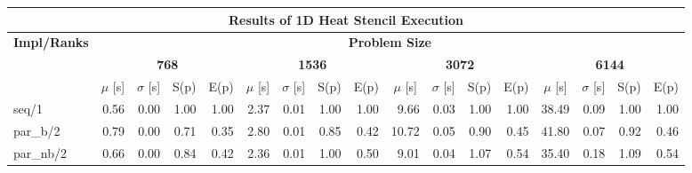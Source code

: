 \begin{tabular}{|lllllllllllllllll|}
\hline
\multicolumn{17}{|c|}{\textbf{Results of 1D Heat Stencil Execution}} \\ \hline
\multicolumn{1}{|c|}{\textbf{Impl/Ranks}} & \multicolumn{16}{c|}{\textbf{Problem Size}} \\ \hline
\multicolumn{1}{|c|}{\textbf{}} & \multicolumn{4}{c|}{\textbf{768}} & \multicolumn{4}{c|}{\textbf{1536}} & \multicolumn{4}{c|}{\textbf{3072}} & \multicolumn{4}{c|}{\textbf{6144}} \\ \hline
\multicolumn{1}{|l|}{} & \multicolumn{1}{c|}{$\mu$ [s]} & \multicolumn{1}{c|}{$\sigma$ [s]} & \multicolumn{1}{c|}{S(p)} & \multicolumn{1}{c|}{E(p)} & \multicolumn{1}{c|}{$\mu$ [s]} & \multicolumn{1}{c|}{$\sigma$ [s]} & \multicolumn{1}{c|}{S(p)} & \multicolumn{1}{c|}{E(p)} & \multicolumn{1}{c|}{$\mu$ [s]} & \multicolumn{1}{c|}{$\sigma$ [s]} & \multicolumn{1}{c|}{S(p)} & \multicolumn{1}{c|}{E(p)} & \multicolumn{1}{c|}{$\mu$ [s]} & \multicolumn{1}{c|}{$\sigma$ [s]} & \multicolumn{1}{c|}{S(p)} & \multicolumn{1}{c|}{E(p)} \\ \hline
\multicolumn{1}{|l|}{seq/1}  & \multicolumn{1}{r|}{0.56} & \multicolumn{1}{r|}{0.00} & \multicolumn{1}{r|}{1.00} & \multicolumn{1}{r|}{1.00}  & \multicolumn{1}{r|}{2.37} & \multicolumn{1}{r|}{0.01} & \multicolumn{1}{r|}{1.00} & \multicolumn{1}{r|}{1.00}  & \multicolumn{1}{r|}{9.66} & \multicolumn{1}{r|}{0.03} & \multicolumn{1}{r|}{1.00} & \multicolumn{1}{r|}{1.00}  & \multicolumn{1}{r|}{38.49} & \multicolumn{1}{r|}{0.09} & \multicolumn{1}{r|}{1.00} & \multicolumn{1}{r|}{1.00}  \\ \hline
\multicolumn{1}{|l|}{par\_b/2}  & \multicolumn{1}{r|}{0.79} & \multicolumn{1}{r|}{0.00} & \multicolumn{1}{r|}{0.71} & \multicolumn{1}{r|}{0.35}  & \multicolumn{1}{r|}{2.80} & \multicolumn{1}{r|}{0.01} & \multicolumn{1}{r|}{0.85} & \multicolumn{1}{r|}{0.42}  & \multicolumn{1}{r|}{10.72} & \multicolumn{1}{r|}{0.05} & \multicolumn{1}{r|}{0.90} & \multicolumn{1}{r|}{0.45}  & \multicolumn{1}{r|}{41.80} & \multicolumn{1}{r|}{0.07} & \multicolumn{1}{r|}{0.92} & \multicolumn{1}{r|}{0.46}  \\ \hline
\multicolumn{1}{|l|}{par\_nb/2}  & \multicolumn{1}{r|}{0.66} & \multicolumn{1}{r|}{0.00} & \multicolumn{1}{r|}{0.84} & \multicolumn{1}{r|}{0.42}  & \multicolumn{1}{r|}{2.36} & \multicolumn{1}{r|}{0.01} & \multicolumn{1}{r|}{1.00} & \multicolumn{1}{r|}{0.50}  & \multicolumn{1}{r|}{9.01} & \multicolumn{1}{r|}{0.04} & \multicolumn{1}{r|}{1.07} & \multicolumn{1}{r|}{0.54}  & \multicolumn{1}{r|}{35.40} & \multicolumn{1}{r|}{0.18} & \multicolumn{1}{r|}{1.09} & \multicolumn{1}{r|}{0.54}  \\ \hline

\end{tabular}

